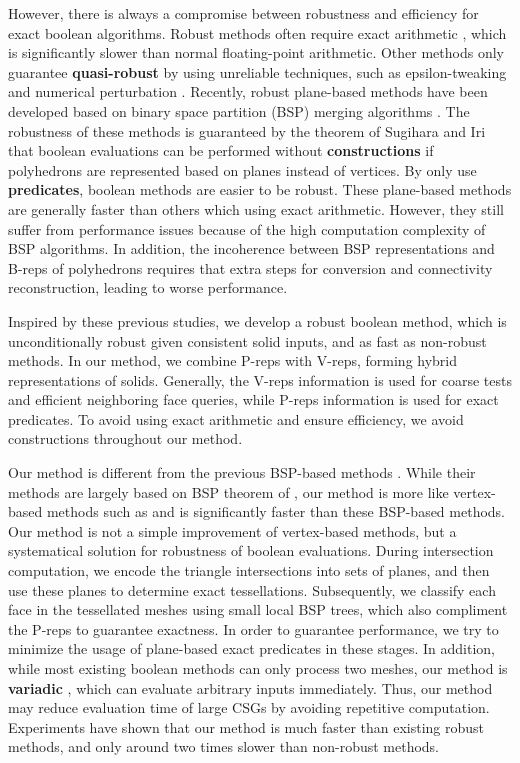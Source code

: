 However, there is always a compromise between robustness and efficiency for exact boolean algorithms.
Robust methods often require exact arithmetic \cite{barki2015exact,zhou2016mesh}, which is significantly slower than normal floating-point arithmetic.
Other methods only guarantee \textbf{quasi-robust} \cite{shewchuk1999lecture} by using unreliable techniques, such as epsilon-tweaking \cite{laidlaw1986constructive,feito2013fast,segal1990using} and numerical perturbation \cite{douze2015quickcsg}.
Recently, robust plane-based methods have been developed \cite{bernstein2009fast,campen2010exact} based on binary space partition (BSP) merging algorithms \cite{naylor1990merging,thibault1987set}.
The robustness of these methods is guaranteed by the theorem of Sugihara and Iri \cite{sugihara1990solid} that boolean evaluations can be performed without \textbf{constructions} \cite{shewchuk1999lecture} if polyhedrons are represented based on planes instead of vertices.
By only use \textbf{predicates}, boolean methods are easier to be robust.
These plane-based methods are generally faster than others which using exact arithmetic. However, they still suffer from performance issues because of the high computation complexity of BSP algorithms. In addition, the incoherence between BSP representations and B-reps of polyhedrons requires that extra steps for conversion and connectivity reconstruction, leading to worse performance.


Inspired by these previous studies, we develop a robust boolean method, which is unconditionally robust given consistent solid inputs, and as fast as non-robust methods. In our method, we combine P-reps with V-reps, forming hybrid representations of solids. Generally, the V-reps information is used for coarse tests and efficient neighboring face queries, while P-reps information is used for exact predicates. To avoid using exact arithmetic and ensure efficiency, we avoid constructions throughout our method.


Our method is different from the previous BSP-based methods \cite{bernstein2009fast,campen2010exact}.
While their methods are largely based on BSP theorem of \cite{naylor1990merging,thibault1987set}, our method is more like vertex-based methods such as \cite{feito2013fast,zhou2016mesh} and is significantly faster than these BSP-based methods. Our method is not a simple improvement of vertex-based methods, but a systematical solution for robustness of boolean evaluations. During intersection computation, we encode the triangle intersections into sets of planes, and then use these planes to determine exact tessellations. Subsequently, we classify each face in the tessellated meshes using small local BSP trees, which also compliment the P-reps to guarantee exactness. In order to guarantee performance, we try to minimize the usage of plane-based exact predicates in these stages. In addition, while most existing boolean methods can only process two meshes, our method is \textbf{variadic} \cite{zhou2016mesh}, which can evaluate arbitrary inputs immediately. Thus, our method may reduce evaluation time of large CSGs by avoiding repetitive computation. Experiments have shown that our method is much faster than existing robust methods, and only around two times slower than non-robust methods.

